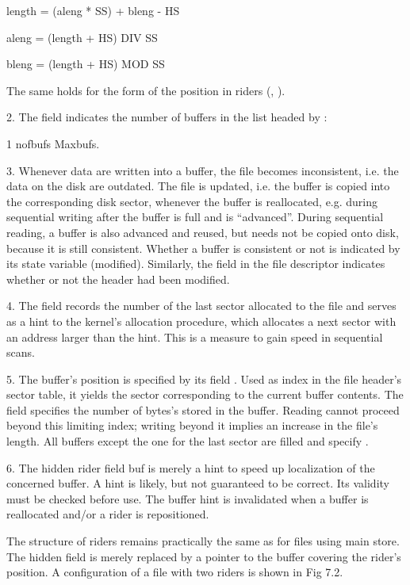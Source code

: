 length = (aleng * SS) + bleng - HS

aleng = (length + HS) DIV SS

bleng = (length + HS) MOD SS

The same holds for the form of the position in riders (, ).

2. The field  indicates the number of buffers in the list headed by :

1 \le nofbufs \le Maxbufs.

3. Whenever data are written into a buffer, the file becomes inconsistent, i.e. the data on the disk are outdated. The file is updated, i.e. the buffer is copied into the corresponding disk sector, whenever the buffer is reallocated, e.g. during sequential writing after the buffer is full and is ``advanced''. During sequential reading, a buffer is also advanced and reused, but needs not be copied onto disk, because it is still consistent. Whether a buffer is consistent or not is indicated by its state variable  (modified). Similarly, the field  in the file descriptor indicates whether or not the header had been modified.

4. The field  records the number of the last sector allocated to the file and serves as a hint to the kernel's allocation procedure, which allocates a next sector with an address larger than the hint. This is a measure to gain speed in sequential scans.

5. The buffer's position is specified by its field . Used as index in the file header's sector table, it yields the sector corresponding to the current buffer contents. The field  specifies the number of bytes's stored in the buffer. Reading cannot proceed beyond this limiting index; writing beyond it implies an increase in the file's length. All buffers except the one for the last sector are filled and specify .

6. The hidden rider field buf is merely a hint to speed up localization of the concerned buffer. A hint is likely, but not guaranteed to be correct. Its validity must be checked before use. The buffer hint is invalidated when a buffer is reallocated and/or a rider is repositioned.

The structure of riders remains practically the same as for files using main store. The hidden field  is merely replaced by a pointer to the buffer covering the rider's position. A configuration of a file  with two riders is shown in Fig 7.2.

